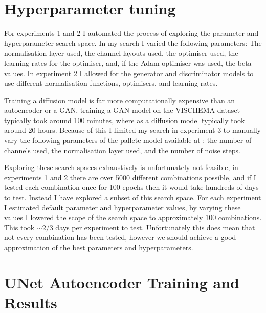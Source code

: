 \documentclass{UoYCSproject}
\begin{document}
\section{Hyperparameter tuning}

For experiments 1 and 2 I automated the process of exploring the parameter and hyperparameter search space. In my search I varied the following parameters: The normalisation layer used, the channel layouts used, the optimiser used, the learning rates for the optimiser, and, if the Adam optimiser was used, the beta values. In experiment 2 I allowed for the generator and discriminator models to use different normalisation functions, optimisers, and learning rates. 

Training a diffusion model is far more computationally expensive than an autoencoder or a GAN, training a GAN model on the VISCHEMA dataset typically took around 100 minutes, where as a diffusion model typically took around 20 hours. 
Because of this I limited my search in experiment 3 to manually vary the following parameters of the pallete model available at \cite{JanspiryPalette}: the number of channels used, the normalisation layer used, and the number of noise steps.

Exploring these search spaces exhaustively is unfortunately not feasible, in experiments 1 and 2 there are over 5000 different combinations possible, and if I tested each combination once for 100 epochs then it would take hundreds of days to test.
Instead I have explored a subset of this search space. For each experiment I estimated default parameter and hyperparameter values, by varying these values I lowered the scope of the search space to approximately 100 combinations. This took \(\sim\)2/3 days per experiment to test. Unfortunately this does mean that not every combination has been tested, however we should achieve a good approximation of the best parameters and hyperparameters.

\section{UNet Autoencoder Training and Results}
\end{document}
